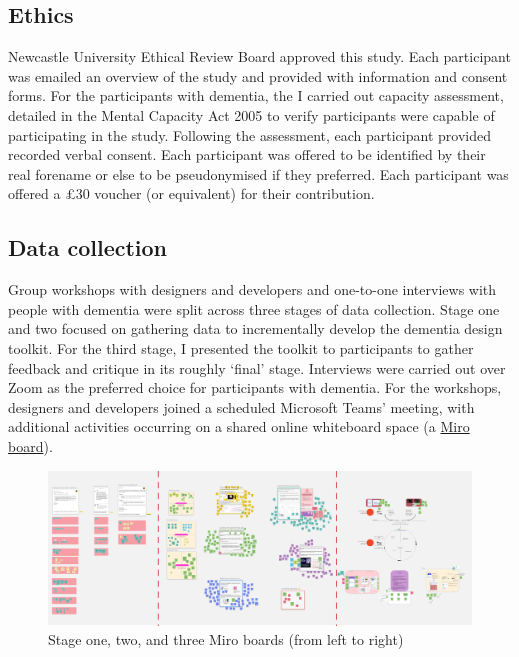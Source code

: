 \subsection{Ethics}
Newcastle University Ethical Review Board approved this study. Each participant was emailed an overview of the study and provided with information and consent forms. For the participants with dementia, the I carried out capacity assessment, detailed in the Mental Capacity Act 2005 \citep{oyebode_mental_2005} to verify participants were capable of participating in the study. Following the assessment, each participant provided recorded verbal consent. Each participant was offered to be identified by their real forename or else to be pseudonymised if they preferred. Each participant was offered a £30 voucher (or equivalent) for their contribution.

\subsection{Data collection}
Group workshops with designers and developers and one-to-one interviews with people with dementia were split across three stages of data collection. Stage one and two focused on gathering data to incrementally develop the dementia design toolkit. For the third stage, I presented the toolkit to participants to gather feedback and critique in its roughly ‘final’ stage. Interviews were carried out over Zoom as the preferred choice for participants with dementia. For the workshops, designers and developers joined a scheduled Microsoft Teams’ meeting, with additional activities occurring on a shared online whiteboard space (a \href{https://miro.com}{Miro board}). 

\begin{figure}[htp]
\centering
\includegraphics[width=1\linewidth]{Images/D3Toolkit/Fig1.png}
\caption{Stage one, two, and three Miro boards (from left to right)}
\label{fig:StagesD3}
\end{figure}

